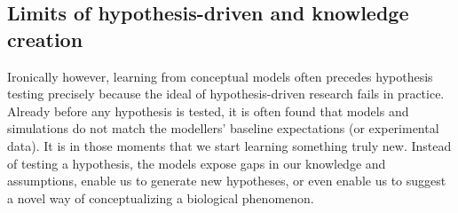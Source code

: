 \subsection{Limits of hypothesis-driven and knowledge creation}

Ironically however, learning from conceptual models often precedes hypothesis testing precisely because the  ideal of hypothesis-driven research fails in practice. Already before any hypothesis is tested, it is often found that models and simulations do not match the modellers’ baseline expectations (or experimental data). It is in those moments that we start learning something truly new. Instead of testing a hypothesis, the models expose gaps in our knowledge and assumptions, enable us to generate new hypotheses, or  even enable us to suggest a novel way of conceptualizing  a biological phenomenon. 
  
